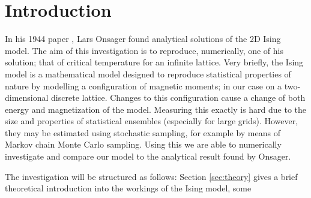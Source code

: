 \section{Introduction}\label{sec:introduction}

In his 1944 paper \cite{Onsager_Ising2D}, Lars Onsager found analytical solutions of the 2D Ising model. The aim of this investigation is to reproduce, numerically, one of his solution; that of critical temperature for an infinite lattice. Very briefly, the Ising model is a mathematical model designed to reproduce statistical properties of nature by modelling a configuration of magnetic moments; in our case on a two-dimensional discrete lattice. Changes to this configuration cause a change of both energy and magnetization of the model. Measuring this exactly is hard due to the size and properties of statistical ensembles (especially for large grids). However, they may be estimated using stochastic sampling, for example by means of Markov chain Monte Carlo sampling. Using this we are able to numerically investigate and compare our model to the analytical result found by Onsager. 

The investigation will be structured as follows: Section \ref{sec:theory} gives a brief theoretical introduction into the workings of the Ising model, some 

